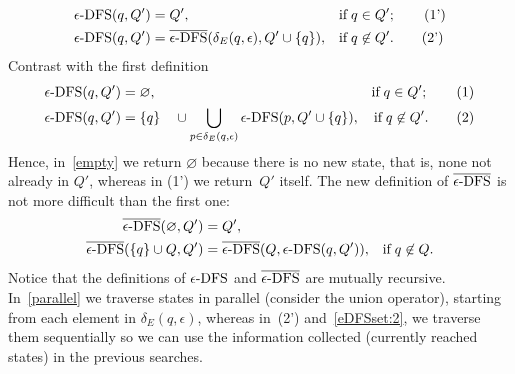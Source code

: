 \begin{align*}
  \epsilon\text{-DFS} (q, Q')
&= Q',
&& \text{if} \; q \in Q'; \tag{1'}\\
  \epsilon\text{-DFS} (q, Q')
&= \overline{\epsilon\text{-DFS}} (\delta_E (q, \epsilon), Q' \cup \{q\}),
&& \text{if} \; q \not\in Q'. \tag{2'}
\end{align*}
Contrast with the first definition
\begin{align*}
   \epsilon\text{-DFS} (q, Q')
&= \varnothing,
& \text{if} \; q \in Q'; \tag{1} \label{empty}\\
  \epsilon\text{-DFS} (q, Q')
&= \{q\} \quad \cup \bigcup_{p \in \delta_E(q,\epsilon)}{\epsilon\text{-DFS} (p, Q'
    \cup \{q\})},
& \text{if} \; q \not\in Q'. \tag{2} \label{parallel}
\end{align*}
Hence, in~\eqref{empty} we return \(\varnothing\) because there is no
new state, that is, none not already in \(Q'\), whereas in (1') we
return~\(Q'\) itself. The new definition of \(\overline{\epsilon\text{-DFS}}\) is not more
difficult than the first one:
\begin{align}
   \overline{\epsilon\text{-DFS}} (\varnothing, Q')
&= Q',\label{eDFSset:1}\\
   \overline{\epsilon\text{-DFS}} (\{q\} \cup Q, Q')
&= \overline{\epsilon\text{-DFS}} (Q, \epsilon\text{-DFS} (q, Q')),
& \text{if} \; q \not\in Q. \label{eDFSset:2}
\end{align}
Notice that the definitions of \(\epsilon\text{-DFS}\) and \(\overline{\epsilon\text{-DFS}}\) are mutually
recursive. In~\eqref{parallel} we traverse states in parallel
(consider the union operator), starting from each element in
\(\delta_E (q, \epsilon)\), whereas in~(2') and~\eqref{eDFSset:2}, we
traverse them sequentially so we can use the information collected
(currently reached states) in the previous searches.

